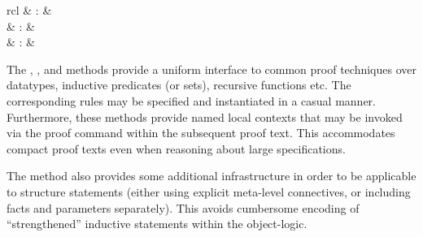 \begin{isabellebody}
\begin{isamarkuptext}
\begin{description}
  \end{description}%
\end{isamarkuptext}%
\isamarkuptrue%
%
\isamarkuptrue%
%
\begin{isamarkuptext}%
\begin{matharray}{rcl}
    \hypertarget{method.cases}{\hyperlink{method.cases}{\mbox{}}} & : &  \\
    \hypertarget{method.induct}{\hyperlink{method.induct}{\mbox{}}} & : &  \\
    \hypertarget{method.coinduct}{\hyperlink{method.coinduct}{\mbox{}}} & : &  \\
  \end{matharray}

  The \hyperlink{method.cases}{\mbox{}}, \hyperlink{method.induct}{\mbox{}}, and \hyperlink{method.coinduct}{\mbox{}}
  methods provide a uniform interface to common proof techniques over
  datatypes, inductive predicates (or sets), recursive functions etc.
  The corresponding rules may be specified and instantiated in a
  casual manner.  Furthermore, these methods provide named local
  contexts that may be invoked via the \hyperlink{command.case}{\mbox{}} proof command
  within the subsequent proof text.  This accommodates compact proof
  texts even when reasoning about large specifications.

  The \hyperlink{method.induct}{\mbox{}} method also provides some additional
  infrastructure in order to be applicable to structure statements
  (either using explicit meta-level connectives, or including facts
  and parameters separately).  This avoids cumbersome encoding of
  ``strengthened'' inductive statements within the object-logic.


\end{isamarkuptext}
\end{isabellebody}
